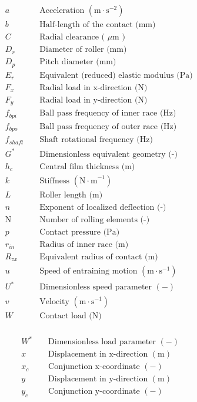 \begin{align*}
	&a && \text { Acceleration }\left(\mathrm{m \cdot s}^{-2}\right) \\
	&b && \text { Half-length of the contact (mm) } \\
	&C && \text { Radial clearance ( } \mu \mathrm{m} \text { ) } \\
	&D_r && \text { Diameter of roller (mm) } \\
	&D_p && \text { Pitch diameter (mm) } \\
	&E_r && \text { Equivalent (reduced) elastic modulus (Pa) } \\
	&F_x && \text { Radial load in x-direction (N) } \\
	&F_y && \text { Radial load in y-direction (N) } \\
	&f_{b p i} && \text { Ball pass frequency of inner race (Hz) } \\
	&f_{b p o} && \text { Ball pass frequency of outer race (Hz) } \\
	&f_{s h a f t} && \text { Shaft rotational frequency (Hz) } \\
	&G^* && \text { Dimensionless equivalent geometry (-) } \\
	&h_c && \text { Central film thickness (m) } \\
	&k && \text { Stiffness }\left(\mathrm{N \cdot m}^{-1}\right) \\
	&L && \text { Roller length (m) } \\
	&n && \text { Exponent of localized deflection (-) } \\
	&\mathrm{N} && \text { Number of rolling elements (-) } \\
	&p && \text { Contact pressure (Pa) } \\
	&r_{i n} && \text { Radius of inner race (m) } \\
	&R_{z x} && \text { Equivalent radius of contact (m) } \\
	&u && \text { Speed of entraining motion }\left(\mathrm{m} \cdot \mathrm{s}^{-1}\right) \\
	&U^* && \text { Dimensionless speed parameter }(-) \\
	&v && \text { Velocity }\left(\mathrm{m} \cdot \mathrm{s}^{-1}\right) \\
	&W && \text { Contact load (N) } \\
\end{align*}

\pagebreak

\begin{align*}
	&W^* && \text { Dimensionless load parameter }(-) \\
	&x && \text { Displacement in x-direction }(\mathrm{m}) \\
	&x_c && \text { Conjunction x-coordinate }(-) \\
	&y && \text { Displacement in y-direction }(\mathrm{m}) \\
	&y_c && \text { Conjunction y-coordinate }(-) \\
\end{align*}
	
